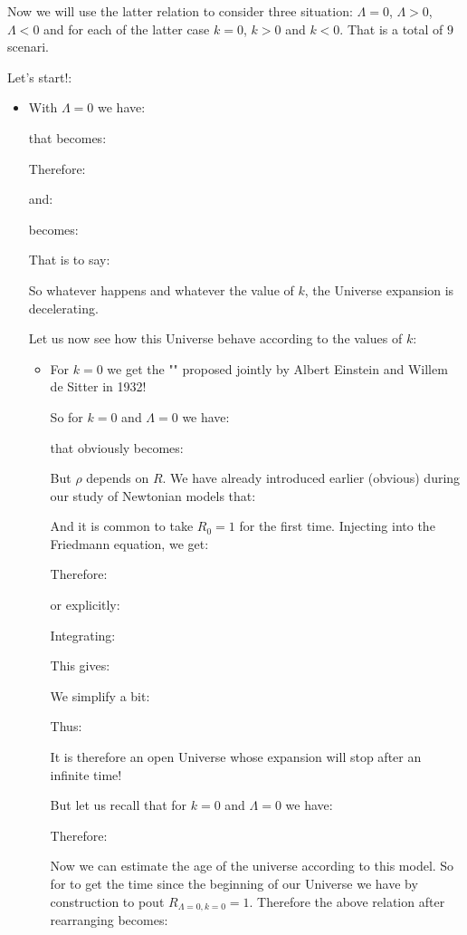 	
	Now we will use the latter relation to consider three situation: $\Lambda=0$, $\Lambda>0$, $\Lambda<0$ and for each of the latter case $k=0$, $k>0$ and $k<0$. That is a total of $9$ scenari.

	Let's start!:
	\begin{itemize}
		\item With $\Lambda=0$ we have:
			
			that becomes:
			
			Therefore:
			
			and:
			
			becomes:
			
			That is to say:
			
			So whatever happens and whatever the value of $k$, the Universe expansion is decelerating.
			
			Let us now see how this Universe behave according to the values of $k$:
			\begin{itemize}
				\item For $k=0$ we get the "" proposed jointly by Albert Einstein and Willem de Sitter in 1932!
				
				So for $k=0$ and $\Lambda=0$ we have:
				
				that obviously becomes:
				
				But $\rho$ depends on $R$. We have already introduced earlier (obvious) during our study of Newtonian models that:
				
				And it is common to take $R_0=1$ for the first time. Injecting into the Friedmann equation, we get:
				
				Therefore:
				
				or explicitly:
				
				Integrating:
				
				This gives:
				
				We simplify a bit:
				
				Thus:
				
				It is therefore an open Universe whose expansion will stop after an infinite time!
				
				But let us recall that for $k=0$ and $\Lambda=0$ we have:
				
				Therefore:
				
				Now we can estimate the age of the universe according to this model. So for to get the time since the beginning of our Universe we have by construction to pout $R_{\Lambda=0,k=0}=1$. Therefore the above relation after rearranging becomes:
				

\end{itemize}
\end{itemize}
